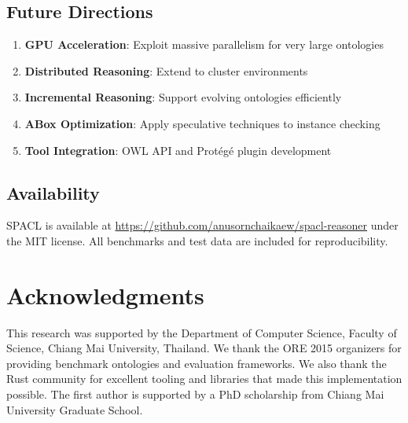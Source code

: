 \documentclass[preprint,12pt]{elsarticle}
\begin{document}
\subsection{Future Directions}
\label{sec:future}

\begin{enumerate}
    \item \textbf{GPU Acceleration}: Exploit massive parallelism for very large ontologies
    \item \textbf{Distributed Reasoning}: Extend to cluster environments
    \item \textbf{Incremental Reasoning}: Support evolving ontologies efficiently
    \item \textbf{ABox Optimization}: Apply speculative techniques to instance checking
    \item \textbf{Tool Integration}: OWL API and Protégé plugin development
\end{enumerate}

\subsection{Availability}
\label{sec:availability}

SPACL is available at \url{https://github.com/anusornchaikaew/spacl-reasoner} under the MIT license. All benchmarks and test data are included for reproducibility.

\section*{Acknowledgments}
\label{sec:ack}

This research was supported by the Department of Computer Science, Faculty of Science, Chiang Mai University, Thailand. We thank the ORE 2015 organizers for providing benchmark ontologies and evaluation frameworks. We also thank the Rust community for excellent tooling and libraries that made this implementation possible. The first author is supported by a PhD scholarship from Chiang Mai University Graduate School.




\appendix
\end{document}

